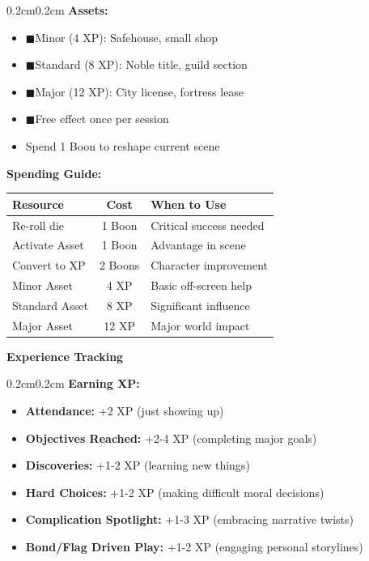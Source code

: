 \documentclass[10pt]{article}
\newcommand{\asset}{\textcolor{green!60!black}{$\blacksquare$}}
\begin{document}
\begin{mdframed}[backgroundcolor=background, linewidth=0pt]
\begin{adjustwidth}{0.2cm}{0.2cm}
\textbf{Assets:}
\begin{itemize}[leftmargin=*]
\item \asset Minor (4 XP): Safehouse, small shop
\item \asset Standard (8 XP): Noble title, guild section
\item \asset Major (12 XP): City license, fortress lease
\item \asset Free effect once per session
\item Spend 1 Boon to reshape current scene
\end{itemize}

\textbf{Spending Guide:}
\begin{center}
\begin{tabular}{|l|c|l|}
\hline
\cellcolor{lightaccent} \textbf{Resource} & \cellcolor{lightaccent} \textbf{Cost} & \cellcolor{lightaccent} \textbf{When to Use} \\
\hline
Re-roll die & 1 Boon & Critical success needed \\
Activate Asset & 1 Boon & Advantage in scene \\
Convert to XP & 2 Boons & Character improvement \\
Minor Asset & 4 XP & Basic off-screen help \\
Standard Asset & 8 XP & Significant influence \\
Major Asset & 12 XP & Major world impact \\
\hline
\end{tabular}
\end{center}
\end{adjustwidth}

\vspace{0.3cm}

\begin{mdframed}[backgroundcolor=sectionbg, linewidth=1pt, linecolor=accentcolor]
\textbf{\large Experience Tracking}
\end{mdframed}

\begin{adjustwidth}{0.2cm}{0.2cm}
\vspace{0.2cm}
\textbf{Earning XP:}
\begin{itemize}[leftmargin=*]
\item \textbf{Attendance:} +2 XP (just showing up)
\item \textbf{Objectives Reached:} +2-4 XP (completing major goals)
\item \textbf{Discoveries:} +1-2 XP (learning new things)
\item \textbf{Hard Choices:} +1-2 XP (making difficult moral decisions)
\item \textbf{Complication Spotlight:} +1-3 XP (embracing narrative twists)
\item \textbf{Bond/Flag Driven Play:} +1-2 XP (engaging personal storylines)
\end{itemize}


\end{adjustwidth}
\end{mdframed}
\end{document}
